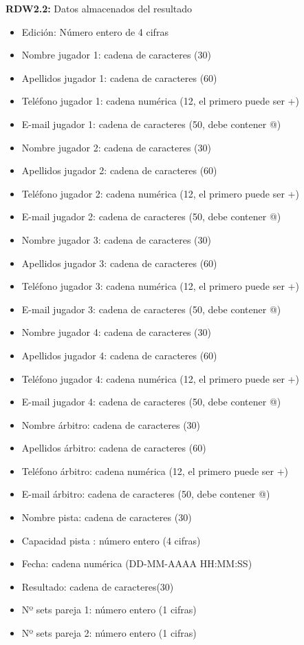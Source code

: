 \textbf{RDW2.2:} Datos almacenados del resultado
\begin{itemize}
	\item Edición: Número entero de 4 cifras
\newline
	\item Nombre jugador 1: cadena de caracteres (30)
	\item Apellidos jugador 1: cadena de caracteres (60)
	\item Teléfono jugador 1: cadena numérica (12, el primero puede ser +)
	\item E-mail jugador 1: cadena de caracteres (50, debe contener @)
\newline
	\item Nombre jugador 2: cadena de caracteres (30)
	\item Apellidos jugador 2: cadena de caracteres (60)
	\item Teléfono jugador 2: cadena numérica (12, el primero puede ser +)
	\item E-mail jugador 2: cadena de caracteres (50, debe contener @)
\newline
	\item Nombre jugador 3: cadena de caracteres (30)
	\item Apellidos jugador 3: cadena de caracteres (60)
	\item Teléfono jugador 3: cadena numérica (12, el primero puede ser +)
	\item E-mail jugador 3: cadena de caracteres (50, debe contener @)
\newline
	\item Nombre jugador 4: cadena de caracteres (30)
	\item Apellidos jugador 4: cadena de caracteres (60)
	\item Teléfono jugador 4: cadena numérica (12, el primero puede ser +)
	\item E-mail jugador 4: cadena de caracteres (50, debe contener @)
\newline
	\item Nombre árbitro: cadena de caracteres (30)
	\item Apellidos árbitro: cadena de caracteres (60)
	\item Teléfono árbitro: cadena numérica (12, el primero puede ser +)
	\item E-mail árbitro: cadena de caracteres (50, debe contener @)
\newline
	\item Nombre pista: cadena de caracteres (30)
	\item Capacidad pista : número entero (4 cifras)
	\item Fecha: cadena numérica (DD-MM-AAAA HH:MM:SS)
\newline
	\item Resultado: cadena de caracteres(30)
	\item Nº sets pareja 1: número entero (1 cifras)
	\item Nº sets pareja 2: número entero (1 cifras)
\end{itemize}

